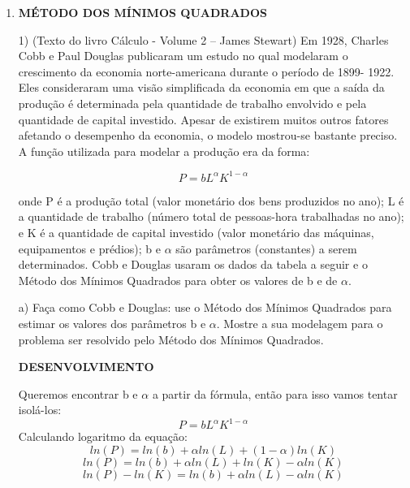 \documentclass[leqno]{article}
\numberwithin{equation}{section}
\begin{document}
	\begin{enumerate}
		
		
		\item  \textbf{{\large MÉTODO DOS MÍNIMOS QUADRADOS}}\\
	
		
		\begin{tcolorbox}[colback=green!5,colframe=green!40!black]
			1) (Texto do livro Cálculo - Volume 2 – James Stewart) Em 1928, Charles
			Cobb e Paul Douglas publicaram um estudo no qual modelaram o
			crescimento da economia norte-americana durante o período de 1899-
			1922. Eles consideraram uma visão simplificada da economia em que a
			saída da produção é determinada pela quantidade de trabalho envolvido e
			pela quantidade de capital investido. Apesar de existirem muitos outros
			fatores afetando o desempenho da economia, o modelo mostrou-se
			bastante preciso. A função utilizada para modelar a produção era da forma:
			
			$$𝑃 = bL^{\alpha}K^{1 - \alpha}$$
			
			onde P é a produção total (valor monetário dos bens produzidos no ano);
			L é a quantidade de trabalho (número total de pessoas-hora trabalhadas no
			ano); e K é a quantidade de capital investido (valor monetário das
			máquinas, equipamentos e prédios); b e $\alpha$ são parâmetros (constantes) a
			serem determinados.
			Cobb e Douglas usaram os dados da tabela a seguir e o Método dos
			Mínimos Quadrados para obter os valores de b e de $\alpha$.
		\end{tcolorbox}
		
		\begin{tcolorbox}[colback=gray!5,colframe=gray!40!black]	
			a) Faça como Cobb e Douglas: use o Método dos Mínimos Quadrados
			para estimar os valores dos parâmetros b e $\alpha$. Mostre a sua modelagem
			para o problema ser resolvido pelo Método dos Mínimos Quadrados.
		\end{tcolorbox}		
	
		
		\textbf{{\normalsize DESENVOLVIMENTO}}
		
		Queremos encontrar b e $\alpha$ a partir da fórmula, então para isso vamos tentar isolá-los:
		$$𝑃 = bL^{\alpha}K^{1 - \alpha}$$
		Calculando logaritmo da equação:
		$$ln(𝑃) = ln(b) + \alpha ln(L) + (1-\alpha)ln(K)$$
		$$ln(𝑃) = ln(b) + \alpha ln(L) + ln(K) - \alpha ln(K)$$
		$$ln(𝑃) - ln(K) = ln(b) + \alpha ln(L) - \alpha ln(K)$$
		

\end{enumerate}
\end{document}
